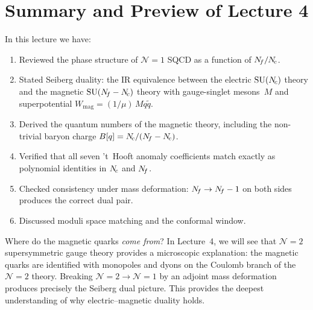\documentclass[11pt,a4paper]{article}
\begin{document}
\section{Summary and Preview of Lecture 4}
\label{sec:summary}

In this lecture we have:
\begin{enumerate}
  \item Reviewed the phase structure of $\mathcal{N}=1$ SQCD as a function
    of $N_{\!f}/N_{\!c}$.
  \item Stated Seiberg duality: the IR equivalence between the electric
    $\mathrm{SU}(N_{\!c})$ theory and the magnetic $\mathrm{SU}(N_{\!f} - N_{\!c})$ theory with
    gauge-singlet mesons~$M$ and superpotential $W_{\text{mag}} =
    (1/\mu)\, M q \widetilde{q}$.
  \item Derived the quantum numbers of the magnetic theory, including
    the non-trivial baryon charge $B[q] = N_{\!c}/(N_{\!f} - N_{\!c})$.
  \item Verified that all seven 't~Hooft anomaly coefficients match
    exactly as polynomial identities in $N_{\!c}$ and $N_{\!f}$.
  \item Checked consistency under mass deformation: $N_{\!f} \to N_{\!f} - 1$ on
    both sides produces the correct dual pair.
  \item Discussed moduli space matching and the conformal window.
\end{enumerate}

\begin{previewbox}[title={Preview: Lecture 4}]
  Where do the magnetic quarks \emph{come from}?  In Lecture~4, we will see
  that $\mathcal{N}=2$ supersymmetric gauge theory provides a microscopic
  explanation: the magnetic quarks are identified with monopoles and dyons
  on the Coulomb branch of the $\mathcal{N}=2$ theory.  Breaking
  $\mathcal{N}=2 \to \mathcal{N}=1$ by an adjoint mass deformation produces
  precisely the Seiberg dual picture.  This provides the deepest understanding
  of why electric--magnetic duality holds.
\end{previewbox}
\end{document}
